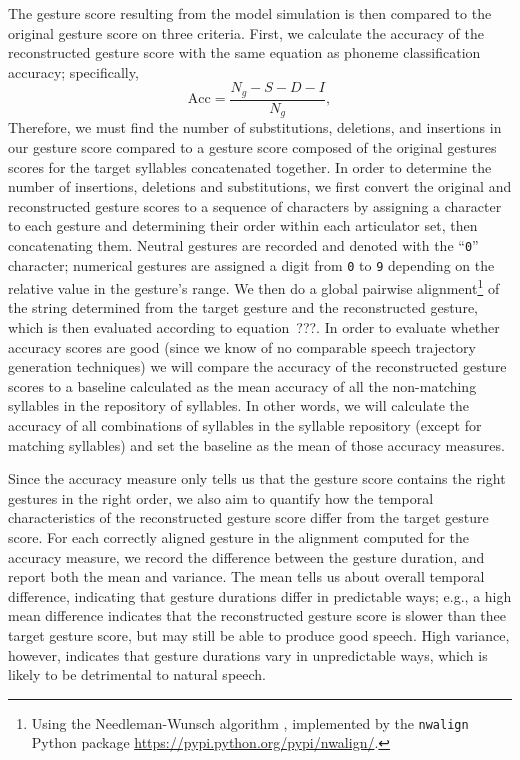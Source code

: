 The gesture score resulting from the model simulation
is then compared to the original gesture score
on three criteria.
First, we calculate the accuracy
of the reconstructed gesture score
with the same equation as phoneme classification accuracy;
specifically,
\begin{equation}
  \text{Acc} = \frac{N_g - S - D - I}{N_g},
\end{equation}
Therefore, we must find the number of
substitutions, deletions, and insertions
in our gesture score compared to
a gesture score composed of
the original gestures scores
for the target syllables
concatenated together.
In order to determine the number of
insertions, deletions and substitutions,
we first convert the original
and reconstructed gesture scores
to a sequence of characters
by assigning a character to each gesture
and determining their order
within each articulator set,
then concatenating them.
Neutral gestures are recorded
and denoted with the ``\texttt{0}'' character;
numerical gestures are assigned
a digit from \texttt{0} to \texttt{9}
depending on the relative value
in the gesture's range.
We then do a global pairwise alignment\footnote{
  Using the Needleman-Wunsch algorithm \cite{needleman1970},
  implemented by the \texttt{nwalign} Python package
  \url{https://pypi.python.org/pypi/nwalign/}.}
of the string determined
from the target gesture
and the reconstructed gesture,
which is then evaluated
according to equation~???.
In order to evaluate whether
accuracy scores are good
(since we know of no comparable
speech trajectory generation techniques)
we will compare the accuracy
of the reconstructed gesture scores
to a baseline calculated as
the mean accuracy of all the
non-matching syllables in the
repository of syllables.
In other words, we will calculate
the accuracy of all combinations
of syllables in the syllable repository
(except for matching syllables)
and set the baseline as the mean
of those accuracy measures.

Since the accuracy measure only tells us
that the gesture score contains
the right gestures in the right order,
we also aim to quantify
how the temporal characteristics
of the reconstructed gesture score
differ from the target gesture score.
For each correctly aligned gesture
in the alignment computed
for the accuracy measure,
we record the difference
between the gesture duration,
and report both the mean and variance.
The mean tells us about
overall temporal difference,
indicating that gesture durations
differ in predictable ways;
e.g., a high mean difference
indicates that
the reconstructed gesture score
is slower than thee target gesture score,
but may still be able to
produce good speech.
High variance, however,
indicates that
gesture durations vary in unpredictable ways,
which is likely to be detrimental
to natural speech.

